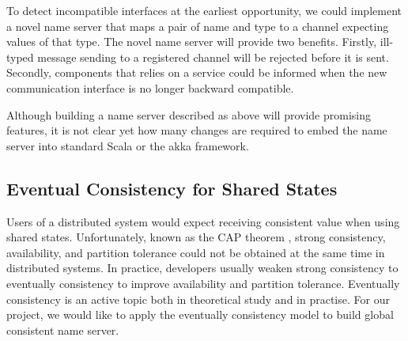 To detect incompatible interfaces at the earliest opportunity, we could implement a novel name server that maps a pair of name and type to a channel expecting values of that type.  The novel name server will provide two benefits.  Firstly, ill-typed message sending to a registered channel will be rejected before it is sent.  Secondly, components that relies on a service could be informed when the new communication interface is no longer backward compatible.

Although building a name server described as above will provide promising features, it is not clear yet how many changes are required to embed the name server into standard Scala or the akka framework.

\subsection{Eventual Consistency for Shared States}
Users of a distributed system would expect receiving consistent value when using shared states. Unfortunately, known as the CAP theorem \cite{CAP}, strong consistency, availability, and partition tolerance could not be obtained at the same time in distributed systems.  In practice, developers usually weaken strong consistency to eventually consistency to improve availability and partition tolerance.  Eventually consistency is an active topic both in theoretical study\cite{Eventually_Consistent_Transactions, Vogels_2009} and in practise\cite{Dynamo}.  For our project, we would like to apply the eventually consistency model to build global consistent name server.

